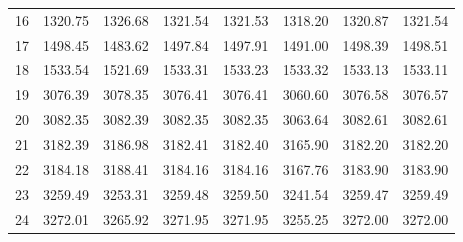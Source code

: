 \documentclass[10pt,oneside]{article}
\begin{document}
\begin{table}[h!]
\begin{tabular}{cccccccc}
16 &   1320.75 & 1326.68 & 1321.54 & 1321.53 &      1318.20 & 1320.87 & 1321.54 \\
17 &   1498.45 & 1483.62 & 1497.84 & 1497.91 &      1491.00 & 1498.39 & 1498.51 \\
18 &   1533.54 & 1521.69 & 1533.31 & 1533.23 &      1533.32 & 1533.13 & 1533.11 \\
19 &   3076.39 & 3078.35 & 3076.41 & 3076.41 &      3060.60 & 3076.58 & 3076.57 \\
20 &   3082.35 & 3082.39 & 3082.35 & 3082.35 &      3063.64 & 3082.61 & 3082.61 \\
21 &   3182.39 & 3186.98 & 3182.41 & 3182.40 &      3165.90 & 3182.20 & 3182.20 \\
22 &   3184.18 & 3188.41 & 3184.16 & 3184.16 &      3167.76 & 3183.90 & 3183.90 \\
23 &   3259.49 & 3253.31 & 3259.48 & 3259.50 &      3241.54 & 3259.47 & 3259.49 \\
24 &   3272.01 & 3265.92 & 3271.95 & 3271.95 &      3255.25 & 3272.00 & 3272.00 \\
\bottomrule
\end{tabular}
\end{table}

\clearpage
\end{document}
